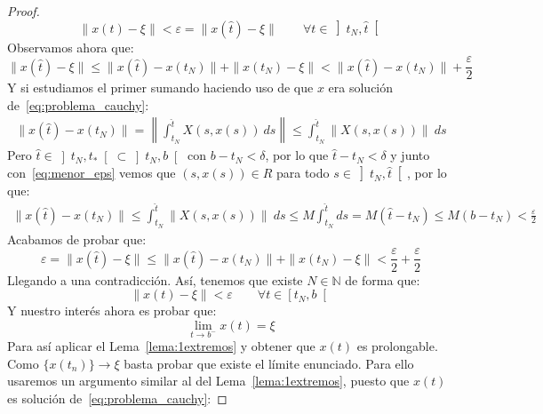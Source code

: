 \begin{lema}
\begin{proof}
        \begin{equation}\label{eq:menor_eps}
            \|x(t)-\xi\| < \varepsilon = \|x\left(\hat{t}\right)-\xi\| \qquad \forall t\in \left]t_N,\hat{t}\right[
        \end{equation}
        Observamos ahora que:
        \begin{equation*}
            \|x\left(\hat{t}\right) - \xi\| \leq \|x\left(\hat{t}\right) - x(t_N)\| + \|x(t_N)-\xi\| < \|x\left(\hat{t}\right) - x(t_N)\| + \frac{\varepsilon}{2}
        \end{equation*}
        Y si estudiamos el primer sumando haciendo uso de que $x$ era solución de~\eqref{eq:problema_cauchy}:
        \begin{align*}
            \|x\left(\hat{t}\right) - x(t_N)\| = \left\|\int_{t_N}^{\hat{t}} X(s,x(s))~ds \right\| \leq \int_{t_N}^{\hat{t}} \|X(s,x(s))\|~ds
        \end{align*}
        Pero $\hat{t} \in \left]t_N,t_\ast\right[\subset \left]t_N,b\right[$ con $b-t_N<\delta$, por lo que $\hat{t}-t_N<\delta$ y junto con~\eqref{eq:menor_eps} vemos que $(s,x(s))\in R$ para todo $s\in \left]t_N,\hat{t}\right[$, por lo que:
        \begin{align*}
            \|x\left(\hat{t}\right) - x(t_N)\| \leq \int_{t_N}^{\hat{t}} \|X(s,x(s))\|~ds \leq M\int_{t_N}^{\hat{t}}ds = M(\hat{t}-t_N) \leq M(b-t_N) < \frac{\varepsilon}{2}
        \end{align*}
        Acabamos de probar que:
        \begin{equation*}
            \varepsilon = \|x\left(\hat{t}\right) - \xi\| \leq \|x\left(\hat{t}\right) - x(t_N)\| + \|x(t_N)-\xi\| < \frac{\varepsilon}{2} + \frac{\varepsilon}{2}
        \end{equation*}
        Llegando a una contradicción. Así, tenemos que existe $N\in \mathbb{N}$ de forma que:
        \begin{equation*}
            \|x(t) - \xi\| < \varepsilon \qquad \forall t\in \left[t_N,b\right[
        \end{equation*}
        Y nuestro interés ahora es probar que:
        \begin{equation*}
            \lim_{t\to b^-}x(t) = \xi
        \end{equation*}
        Para así aplicar el Lema~\ref{lema:1extremos} y obtener que $x(t)$ es prolongable. Como $\{x(t_n)\}\to \xi$ basta probar que existe el límite enunciado. Para ello usaremos un argumento similar al del Lema~\ref{lema:1extremos}, puesto que $x(t)$ es solución de~\eqref{eq:problema_cauchy}:

\end{proof}
\end{lema}
